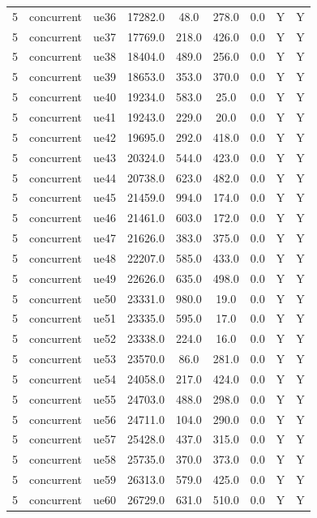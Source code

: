 \begin{table}[ht]
\begin{tabular}{|c|c|c|c|c|c|c|c|c|}
5 & concurrent & ue36 & 17282.0 & 48.0 & 278.0 & 0.0 & Y & Y \\
5 & concurrent & ue37 & 17769.0 & 218.0 & 426.0 & 0.0 & Y & Y \\
5 & concurrent & ue38 & 18404.0 & 489.0 & 256.0 & 0.0 & Y & Y \\
5 & concurrent & ue39 & 18653.0 & 353.0 & 370.0 & 0.0 & Y & Y \\
5 & concurrent & ue40 & 19234.0 & 583.0 & 25.0 & 0.0 & Y & Y \\
5 & concurrent & ue41 & 19243.0 & 229.0 & 20.0 & 0.0 & Y & Y \\
5 & concurrent & ue42 & 19695.0 & 292.0 & 418.0 & 0.0 & Y & Y \\
5 & concurrent & ue43 & 20324.0 & 544.0 & 423.0 & 0.0 & Y & Y \\
5 & concurrent & ue44 & 20738.0 & 623.0 & 482.0 & 0.0 & Y & Y \\
5 & concurrent & ue45 & 21459.0 & 994.0 & 174.0 & 0.0 & Y & Y \\
5 & concurrent & ue46 & 21461.0 & 603.0 & 172.0 & 0.0 & Y & Y \\
5 & concurrent & ue47 & 21626.0 & 383.0 & 375.0 & 0.0 & Y & Y \\
5 & concurrent & ue48 & 22207.0 & 585.0 & 433.0 & 0.0 & Y & Y \\
5 & concurrent & ue49 & 22626.0 & 635.0 & 498.0 & 0.0 & Y & Y \\
5 & concurrent & ue50 & 23331.0 & 980.0 & 19.0 & 0.0 & Y & Y \\
5 & concurrent & ue51 & 23335.0 & 595.0 & 17.0 & 0.0 & Y & Y \\
5 & concurrent & ue52 & 23338.0 & 224.0 & 16.0 & 0.0 & Y & Y \\
5 & concurrent & ue53 & 23570.0 & 86.0 & 281.0 & 0.0 & Y & Y \\
5 & concurrent & ue54 & 24058.0 & 217.0 & 424.0 & 0.0 & Y & Y \\
5 & concurrent & ue55 & 24703.0 & 488.0 & 298.0 & 0.0 & Y & Y \\
5 & concurrent & ue56 & 24711.0 & 104.0 & 290.0 & 0.0 & Y & Y \\
5 & concurrent & ue57 & 25428.0 & 437.0 & 315.0 & 0.0 & Y & Y \\
5 & concurrent & ue58 & 25735.0 & 370.0 & 373.0 & 0.0 & Y & Y \\
5 & concurrent & ue59 & 26313.0 & 579.0 & 425.0 & 0.0 & Y & Y \\
5 & concurrent & ue60 & 26729.0 & 631.0 & 510.0 & 0.0 & Y & Y \\

\end{tabular}
\end{table}
